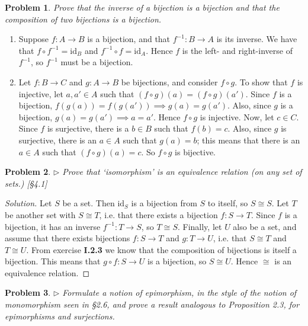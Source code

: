 \documentclass[fontsize=14pt]{scrartcl}
\newtheorem{problem-internal}{Problem}[subsection]
\newenvironment{problem}{
  \medskip
  \begin{problem-internal}
}{
  \end{problem-internal}
}
\newenvironment{solution}{
  \begin{proof}[Solution]
  \vspace{-8px}
  \setlength{\parskip}{4px}
  \setlength{\parindent}{0px}
}{
  \end{proof}
}
\newcommand{\id}{\mathrm{id}}
\begin{document}
\begin{problem}
Prove that the inverse of a bijection is a bijection and that the
composition of two bijections is a bijection.
\end{problem}

\begin{enumerate}
\item Suppose $f:A\to B$ is a bijection, and that $f^{-1}:B\to A$ is its inverse.
We have that $f\circ f^{-1} = \id_B$ and $f^{-1}\circ f = \id_A$. Hence $f$ is
the left- and right-inverse of $f^{-1}$, so $f^{-1}$ must be a bijection.

\item Let $f:B\to C$ and $g:A\to B$ be bijections, and consider $f\circ g$. To
show that $f$ is injective, let $a, a'\in A$ such that $(f\circ g)(a) = (f\circ
g)(a')$. Since $f$ is a bijection, $f(g(a)) = f(g(a')) \implies g(a) = g(a')$.
Also, since $g$ is a bijection, $g(a) = g(a') \implies a=a'$. Hence $f\circ g$
is injective. Now, let $c\in C$. Since $f$ is surjective, there is a $b\in B$
such that $f(b) = c$. Also, since $g$ is surjective, there is an $a\in A$ such
that $g(a) = b$; this means that there is an $a\in A$ such that $(f\circ g)(a) =
c$. So $f\circ g$ is bijective.
\end{enumerate}


\begin{problem}
$\rhd$ Prove that `isomorphism' is an equivalence relation (on any set
of sets.) [\S4.1]
\end{problem}

\begin{solution}
Let $S$ be a set. Then $\id_S$ is a bijection from $S$ to itself, so $S\cong S$.
Let $T$ be another set with $S\cong T$, i.e. that there exists a bijection
$f:S\to T$. Since $f$ is a bijection, it has an inverse $f^{-1}:T\to S$, so
$T\cong S$. Finally, let $U$ also be a set, and assume that there exists
bijections $f:S\to T$ and $g:T\to U$, i.e. that $S\cong T$ and $T\cong U$. From
exercise \textbf{I.2.3} we know that the composition of bijections is itself a
bijection. This means that $g\circ f: S\to U$ is a bijection, so $S\cong U$.
Hence $\cong$ is an equivalence relation.
\end{solution}


\begin{problem}
$\rhd$ Formulate a notion of \textit{epimorphism}, in the style
of the notion of \textit{monomorphism} seen in \S 2.6, and prove a result
analogous to Proposition 2.3, for epimorphisms and surjections.
\end{problem}
\end{document}
